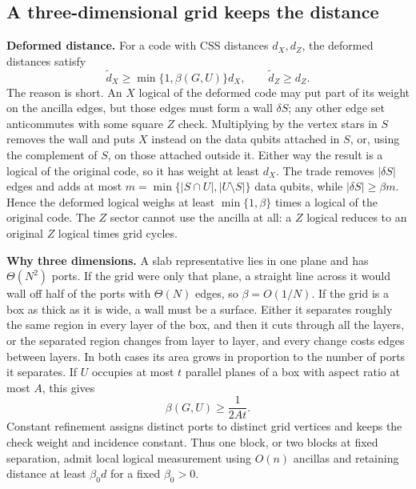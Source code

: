 \documentclass[10pt,a4paper,twocolumn]{article}
\begin{document}
\subsection{A three-dimensional grid keeps the distance}
\label{sec:distance}
\textbf{Deformed distance.}  For a code with CSS distances $d_X,d_Z$, the
deformed distances satisfy
\begin{equation}
 \widetilde d_X\ge\min\{1,\beta(G,U)\}d_X,
 \qquad \widetilde d_Z\ge d_Z.
 \label{eq:gauge-distance}
\end{equation}
The reason is short.  An $X$ logical of the deformed code may put part of its
weight on the ancilla edges, but those edges must form a wall $\delta S$; any
other edge set anticommutes with some square $Z$ check.  Multiplying by the
vertex stars in $S$ removes the wall and puts $X$ instead on the data qubits
attached in $S$, or, using the complement of $S$, on those attached outside it.
Either way the result is a logical of the original code, so it has weight at
least $d_X$.  The trade removes $|\delta S|$ edges and adds at most
$m=\min\{|S\cap U|,|U\setminus S|\}$ data qubits, while $|\delta S|\ge\beta m$.
Hence the deformed logical weighs at least $\min\{1,\beta\}$ times a logical of
the original code.  The $Z$ sector cannot use the ancilla at all: a $Z$ logical
reduces to an original $Z$ logical times grid cycles.

\textbf{Why three dimensions.}  A slab representative lies in one plane and has
$\Theta(N^2)$ ports.  If the grid were only that plane, a straight line across
it would wall off half of the ports with $\Theta(N)$ edges, so $\beta=O(1/N)$.
If the grid is a box as thick as it is wide, a wall must be a surface.  Either it
separates roughly the same region in every layer of the box, and then it cuts
through all the layers, or the separated region changes from layer to layer, and
every change costs edges between layers.  In both cases its area grows in
proportion to the number of ports it separates.  If $U$ occupies at most $t$
parallel planes of a box with aspect ratio at most $A$, this gives
\begin{equation}
 \beta(G,U)\ge\frac{1}{2At}.
 \label{eq:grid-bound}
\end{equation}
Constant refinement assigns distinct ports to distinct grid vertices and keeps
the check weight and incidence constant.  Thus one block, or two blocks at
fixed separation, admit local logical measurement using $O(n)$ ancillas and
retaining distance at least $\beta_0d$ for a fixed $\beta_0>0$.
\end{document}
